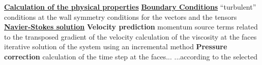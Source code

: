 \begin{table}[htp]
\underline{\textbf{Calculation of the physical properties}}\newline
\underline{\textbf{Boundary Conditions}}\newline
\hspace*{1cm} \newline
\hspace*{1,5cm} \hspace*{1cm} ``turbulent'' conditions at the
wall\newline
\hspace*{1,5cm} \hspace*{1cm} symmetry conditions for the
vectors and the tensors\newline
\underline{\textbf{Navier-Stokes solution}}\newline
\hspace*{1cm}\newline
\hspace*{1,5cm}\textbf{Velocity prediction}\newline
\hspace*{2,0cm} \newline
\hspace*{2,5cm} \hspace*{1cm} momentum source terms related to
the \newline
\hspace*{4,5cm} \hspace*{1cm} transposed gradient of the velocity\newline
\hspace*{2,5cm} \hspace*{1cm} calculation of the viscosity at
the faces\newline
\hspace*{2,5cm} \hspace*{1cm} iterative solution of the system
using an incremental method\newline
\hspace*{1,5cm}\textbf{Pressure correction}\newline
\hspace*{2,0cm} \newline
\hspace*{2,5cm} \hspace*{1cm}calculation of the time step at
the faces...\newline
\hspace*{2,5cm} \hspace*{1,5cm} ...according to the selected

\end{table}

